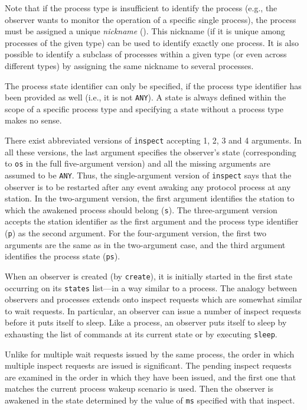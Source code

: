 Note that if the process type is insufficient to identify the process (e.g.,
the observer wants to monitor the operation of a specific single process),
the process must be assigned a unique {\em nickname} ().
This nickname (if it is unique among processes of the given type) can
be used to identify exactly one process.
It is also possible to identify a subclass of processes within a given
type (or even across different types) by assigning the same nickname to
several processes.

The process state identifier can only be specified, if the process type
identifier has been provided as well (i.e., it is not {\tt ANY}).
A state is always defined within the scope of a specific process type and
specifying a state without a process type makes no sense.

There exist abbreviated versions of {\tt inspect}
accepting 1, 2, 3 and 4 arguments.
In all these versions, the last argument
specifies the observer's state
(corresponding to {\tt os} in the full five-argument version) and all the
missing arguments are assumed to be {\tt ANY}.
Thus, the single-argument version of {\tt inspect} says that the observer
is to be restarted after any event awaking any protocol process at any
station.
In the two-argument version, the first argument identifies the station to
which the awakened process should belong ({\tt s}).
The three-argument version accepts the station identifier as the first
argument and the process type identifier ({\tt p}) as the second argument.
For the four-argument version, the first two arguments are the same
as in the two-argument case, and the third argument identifies the process
state ({\tt ps}).

When an observer is created (by {\tt create}), it is initially
started in the first state occurring on its {\tt states} list---in
a way similar to a process.
The analogy between observers and processes extends
onto inspect requests which are somewhat similar to wait requests.
In particular, an observer can issue a number of inspect requests before
it puts itself to sleep.
Like a process, an observer puts itself to sleep by exhausting
the list of commands at its current state or by executing {\tt sleep}.

Unlike for multiple wait requests issued by the same process,
the order in which multiple inspect requests are issued is
significant.
The pending inspect requests are examined in the order in which they have
been issued, and
the first one that matches the current process wakeup scenario is used.
Then the observer is awakened in the state determined by the
value of {\tt ms} specified with that inspect.

